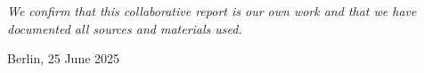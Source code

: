 \chapter*{}
\vspace{17cm}
\hfill\parbox{8cm}{
\raggedleft
\textit{We confirm that this collaborative report is our own work and that we have documented all sources and materials used.}\par 
\vspace{1em}
Berlin, 25 June 2025
}
\thispagestyle{empty}